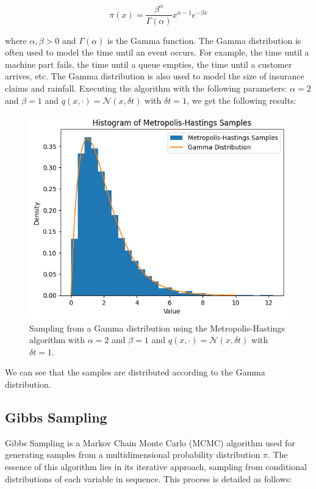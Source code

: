 \documentclass{report}
\begin{document}
\[
	\pi(x) = \frac{\beta^\alpha}{\Gamma(\alpha)} x^{\alpha - 1} e^{-\beta x}
\]

where $\alpha, \beta > 0$ and $\Gamma(\alpha)$ is the Gamma function. The Gamma distribution is often used to model the time until an event occurs. For example, the time until a machine part fails, the time until a queue empties, the time until a customer arrives, etc. The Gamma distribution is also used to model the size of insurance claims and rainfall. Executing the algorithm with the following parameters: $\alpha = 2$ and $\beta = 1$ and $q(x, \cdot) = \mathcal{N}(x, \delta t)$ with $\delta t = 1$, we get the following results:

\begin{figure}[H]
	\centering
	\includegraphics[width=0.5\linewidth]{./Figures/MCMC/gamma.png}
	\caption{Sampling from a Gamma distribution using the Metropolis-Hastings algorithm with $\alpha = 2$ and $\beta = 1$ and $q(x, \cdot) = \mathcal{N}(x, \delta t)$ with $\delta t = 1$.}
	\label{fig:gamma}
\end{figure}

We can see that the samples are distributed according to the Gamma distribution.

\subsection{Gibbs Sampling}
\label{sec:gibbs_sampling}

Gibbs Sampling is a Markov Chain Monte Carlo (MCMC) algorithm used for generating samples from a multidimensional probability distribution $\pi$. The essence of this algorithm lies in its iterative approach, sampling from conditional distributions of each variable in sequence. This process is detailed as follows:
\end{document}
